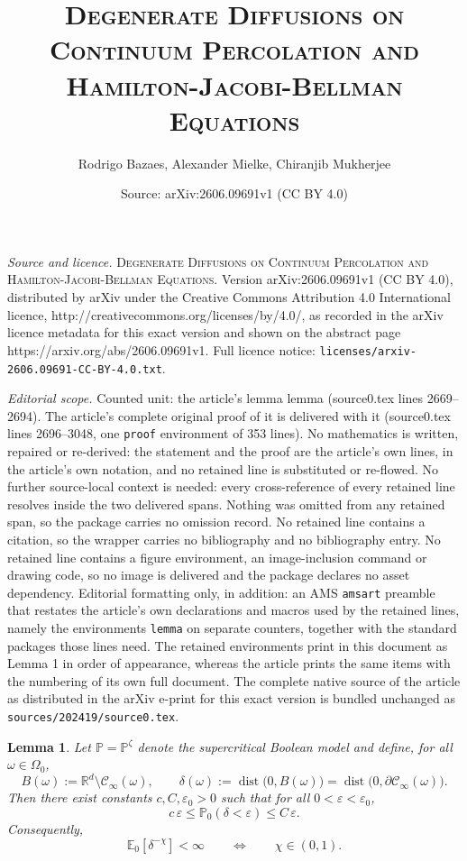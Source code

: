 \documentclass[10pt,a4paper]{amsart}
\title{\textsc{Degenerate Diffusions on Continuum Percolation and Hamilton-Jacobi-Bellman Equations}}
\author{Rodrigo Bazaes, Alexander Mielke, Chiranjib Mukherjee}
\date{Source: arXiv:2606.09691v1 (CC BY 4.0)}
\newtheorem{lemma}{Lemma}
\newcommand{\E}{\mathbb E}
\renewcommand{\P}{\mathbb P}
\newcommand{\dist}{\mathop{\mathrm{dist}}}
\begin{document}
\maketitle

\noindent\emph{Source and licence.} \textsc{Degenerate Diffusions on Continuum Percolation and Hamilton-Jacobi-Bellman Equations}. Version arXiv:2606.09691v1 (CC BY 4.0), distributed by arXiv under the Creative Commons Attribution 4.0 International licence, http://creativecommons.org/licenses/by/4.0/, as recorded in the arXiv licence metadata for this exact version and shown on the abstract page https://arxiv.org/abs/2606.09691v1. Full licence notice: \texttt{licenses/arxiv-2606.09691-CC-BY-4.0.txt}.\par\smallskip

\noindent\textit{Editorial scope.} Counted unit: the article's lemma lemma (source0.tex lines 2669--2694). The article's complete original proof of it is delivered with it (source0.tex lines 2696--3048, one \texttt{proof} environment of 353 lines). No mathematics is written, repaired or re-derived: the statement and the proof are the article's own lines, in the article's own notation, and no retained line is substituted or re-flowed.  No further source-local context is needed: every cross-reference of every retained line resolves inside the two delivered spans.  Nothing was omitted from any retained span, so the package carries no omission record.  No retained line contains a citation, so the wrapper carries no bibliography and no bibliography entry.  No retained line contains a figure environment, an image-inclusion command or drawing code, so no image is delivered and the package declares no asset dependency.  Editorial formatting only, in addition: an AMS \texttt{amsart} preamble that restates the article's own declarations and macros used by the retained lines, namely the environments \texttt{lemma} on separate counters, together with the standard packages those lines need.  The retained environments print in this document as Lemma 1 in order of appearance, whereas the article prints the same items with the numbering of its own full document.  The complete native source of the article as distributed in the arXiv e-print for this exact version is bundled unchanged as \texttt{sources/202419/source0.tex}.
\begin{lemma}
Let $\P=\P^\zeta$ denote the supercritical Boolean model and define, for all $\omega\in\Omega_0$,
\[
B(\omega):=\mathbb R^d\setminus \mathcal C_\infty(\omega),
\qquad
\delta(\omega):=
\dist\bigl(0,B(\omega)\bigr)
=
\dist\bigl(0,\partial\mathcal C_\infty(\omega)\bigr).
\]
Then there exist constants $c,C,\varepsilon_0>0$ such that for all
$0<\varepsilon<\varepsilon_0$,
\[
c\,\varepsilon
\le
\P_0(\delta<\varepsilon)
\le
C\,\varepsilon.
\]
Consequently,
\[
\E_0[\delta^{-\chi}]<\infty
\qquad\Longleftrightarrow\qquad
\chi\in (0,1).
\]
\end{lemma}
\end{document}
